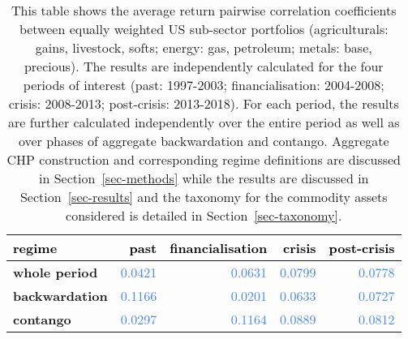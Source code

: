 \documentclass[
  authoryear,
  preprint,
  3p]{elsarticle}
\begin{document}
\begin{longtable}[t]{>{}l>{}r>{}r>{}r>{}r}

\caption{\label{tbl-correlations-cross-periods}This table shows the
average return pairwise correlation coefficients between equally
weighted US sub-sector portfolios (agriculturals: gains, livestock,
softs; energy: gas, petroleum; metals: base, precious). The results are
independently calculated for the four periods of interest (past:
1997-2003; financialisation: 2004-2008; crisis: 2008-2013; post-crisis:
2013-2018). For each period, the results are further calculated
independently over the entire period as well as over phases of aggregate
backwardation and contango. Aggregate CHP construction and corresponding
regime definitions are discussed in Section~\ref{sec-methods} while the
results are discussed in Section~\ref{sec-results} and the taxonomy for
the commodity assets considered is detailed in
Section~\ref{sec-taxonomy}.}

\tabularnewline

\toprule
\textcolor{black}{\textbf{regime}} & \textcolor{black}{\textbf{past}} & \textcolor{black}{\textbf{financialisation}} & \textcolor{black}{\textbf{crisis}} & \textcolor{black}{\textbf{post-crisis}}\\
\midrule
\textbf{whole period} & \textcolor[HTML]{4285f4}{0.0421} & \textcolor[HTML]{4285f4}{0.0631} & \textcolor[HTML]{4285f4}{0.0799} & \textcolor[HTML]{4285f4}{0.0778}\\
\textbf{backwardation} & \textcolor[HTML]{4285f4}{0.1166} & \textcolor[HTML]{4285f4}{0.0201} & \textcolor[HTML]{4285f4}{0.0633} & \textcolor[HTML]{4285f4}{0.0727}\\
\textbf{contango} & \textcolor[HTML]{4285f4}{0.0297} & \textcolor[HTML]{4285f4}{0.1164} & \textcolor[HTML]{4285f4}{0.0889} & \textcolor[HTML]{4285f4}{0.0812}\\
\bottomrule

\end{longtable}

\endgroup{}

\newpage

\newpage
\end{document}
